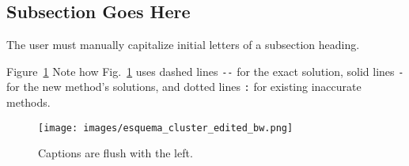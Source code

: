 \documentclass{anstrans}
\begin{document}
\subsection{Subsection Goes Here}
The user must manually capitalize initial letters of a subsection heading.

Figure~\ref{fig:esquema-cluster}
Note how Fig.~\ref{fig:esquema-cluster} uses dashed lines \verb|--| for the exact
solution, solid lines \verb|-| for the new method's solutions, and dotted lines
\verb|:| for existing inaccurate methods.
\begin{figure}[ht] %
  \centering
  \texttt{[image: images/esquema\_cluster\_edited\_bw.png]}
  \caption{Captions are flush with the left.}
  \label{fig:esquema-cluster}
\end{figure}

\end{document}
